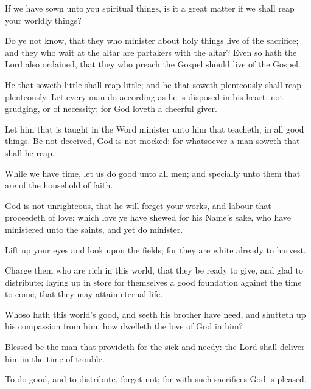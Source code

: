 
If we have sown unto you spiritual things, is it a great matter if we shall reap your worldly things?

Do ye not know, that they who minister about holy things live of the sacrifice; and they who wait at the altar are partakers with the altar? Even so hath the Lord also ordained, that they who preach the Gospel should live of the Gospel.

He that soweth little shall reap little; and he that soweth plenteously shall reap plenteously. Let every man do according as he is disposed in his heart, not grudging, or of necessity; for God loveth a cheerful giver.

Let him that is taught in the Word minister unto him that teacheth, in all good things. Be not deceived, God is not mocked: for whatsoever a man soweth that shall he reap.

While we have time, let us do good unto all men; and specially unto them that are of the household of faith.

God is not unrighteous, that he will forget your works, and labour that proceedeth of love; which love ye have shewed for his Name’s sake, who have ministered unto the saints, and yet do minister.

Lift up your eyes and look upon the fields; for they are white already to harvest.

Charge them who are rich in this world, that they be ready to give, and glad to distribute; laying up in store for themselves a good foundation against the time to come, that they may attain eternal life.

Whoso hath this world’s good, and seeth his brother have need, and shutteth up his compassion from him, how dwelleth the love of God in him?

Blessed be the man that provideth for the sick and needy: the Lord shall deliver him in the time of trouble.

To do good, and to distribute, forget not; for with such sacrifices God is pleased.

